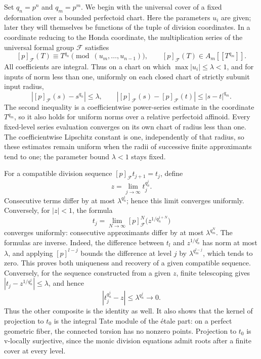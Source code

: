 Set $q_n=p^n$ and $q_m=p^m$.  We begin with the universal cover of a
fixed deformation over a bounded perfectoid chart.  Here the parameters
$u_i$ are given; later they will themselves be functions of the tuple
of division coordinates.  In a coordinate reducing to the Honda
coordinate, the multiplication series of the universal formal group
$\mathcal F$ satisfies
\begin{equation}\label{eq:tower-series-bounds}
 [p]_{\mathcal F}(T)\equiv T^{q_n}
       \pmod{(u_m,\ldots,u_{n-1})},\qquad
 [p]_{\mathcal F}(T)\in A_m[[T^{q_m}]].
\end{equation}
All coefficients are integral. Thus on a chart on which
$\max |u_i|\leq\lambda<1$, and for inputs of norm less than one,
uniformly on each closed chart of strictly subunit input radius,
\[
 |[p]_{\mathcal F}(s)-s^{q_n}|\leq\lambda,
 \qquad
 |[p]_{\mathcal F}(s)-[p]_{\mathcal F}(t)|
       \leq |s-t|^{q_m}.
\]
The second inequality is a coefficientwise power-series estimate in
the coordinate $T^{q_m}$, so it also holds for uniform norms over a
relative perfectoid affinoid. Every fixed-level series evaluation
converges on its own chart of radius less than one. The coefficientwise
Lipschitz constant is one, independently of that radius, so these
estimates remain uniform when the radii of successive finite
approximants tend to one; the parameter bound $\lambda<1$ stays fixed.

For a compatible division sequence
$[p]_{\mathcal F}t_{j+1}=t_j$, define
\begin{equation}\label{eq:tower-normalized-limit}
 z=\lim_{j\to\infty}t_j^{q_n^j}.
\end{equation}
Consecutive terms differ by at most $\lambda^{q_n^j}$; hence this
limit converges uniformly. Conversely, for $|z|<1$, the formula
\begin{equation}\label{eq:tower-inverse-cover}
 t_j=\lim_{N\to\infty}
       [p]_{\mathcal F}^{N}
          \bigl(z^{1/q_n^{j+N}}\bigr)
\end{equation}
converges uniformly: consecutive approximants differ by at most
$\lambda^{q_m^N}$. The formulas are inverse. Indeed, the difference
between $t_l$ and $z^{1/q_n^l}$ has norm at most $\lambda$, and
applying $[p]^{l-j}$ bounds the difference at level $j$ by
$\lambda^{q_m^{l-j}}$, which tends to zero. This proves both
uniqueness and recovery of a given compatible sequence.  Conversely,
for the sequence constructed from a given $z$, finite telescoping
gives $|t_j-z^{1/q_n^j}|\leq\lambda$, and hence
\[
 |t_j^{q_n^j}-z|\leq\lambda^{q_n^j}\longrightarrow0.
\]
Thus the other composite is the identity as well.  It also shows
that the kernel of projection to $t_0$ is the integral Tate module of
the \'{e}tale part: on a perfect geometric fiber, the connected torsion
has no nonzero points. Projection to $t_0$ is v-locally surjective,
since the monic division equations admit roots after a finite cover
at every level.

